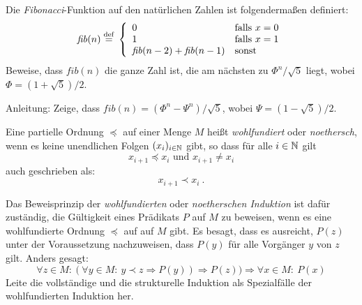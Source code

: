 \begin{aufgabe}
  Die \textit{Fibonacci}-Funktion auf den natürlichen Zahlen ist
  folgendermaßen definiert:
%
  \begin{displaymath}
    \mathit{fib}(n) \stackrel{\rm def}{=}{} \left\{
      \begin{array}{ll}
        0 & \textrm{falls } x = 0\\
        1 & \textrm{falls } x = 1\\
        \mathit{fib}(n-2) + \mathit{fib}(n-1) & \textrm{sonst}
      \end{array}\right.
    \end{displaymath}
%
    Beweise, dass $\mathit{fib}(n)$ die ganze Zahl ist, die am nächsten
    zu $\Phi^n/\sqrt{5}$ liegt, wobei $\Phi = (1+\sqrt{5})/2$.
    
    Anleitung: Zeige, dass $\mathit{fib}(n) = (\Phi^n -
    \Psi^n)/\sqrt{5}$, wobei $\Psi = (1-\sqrt{5})/2$.
\end{aufgabe}

\begin{aufgabe}
Eine partielle Ordnung $\preccurlyeq$ auf einer Menge $M$ heißt
\textit{wohlfundiert} oder \textit{noethersch}, wenn es keine
unendlichen Folgen $(x_i)_{i\in \mathbb{N}}$ gibt, so dass für alle $i\in\mathbb{N}$ gilt
%
\begin{displaymath}
  x_{i+1} \preccurlyeq x_{i} \text{ und } x_{i+1} \neq x_{i}
\end{displaymath}
%
auch geschrieben als:
%
\begin{displaymath}
  x_{i+1} \prec x_{i}\ .
\end{displaymath}
%

Das Beweisprinzip der \textit{wohlfundierten} oder \textit{noetherschen Induktion} ist dafür zuständig, die
Gültigkeit eines Prädikats $P$ auf $M$ zu beweisen, wenn es eine
wohlfundierte Ordnung $\preccurlyeq$ auf auf $M$ gibt.  Es besagt, dass
es ausreicht, $P(z)$ unter der Voraussetzung nachzuweisen, dass $P(y)$
für alle Vorgänger $y$ von $z$ gilt.  Anders gesagt:
%
\begin{displaymath}
  \forall z\in M:(\forall y\in M:~ y\prec z \Rightarrow P(y)) \Rightarrow P(z))
  \Rightarrow \forall x \in M:~P(x)
\end{displaymath}
%
Leite die vollständige und die strukturelle Induktion als Spezialfälle
der wohlfundierten Induktion her.
\end{aufgabe}


